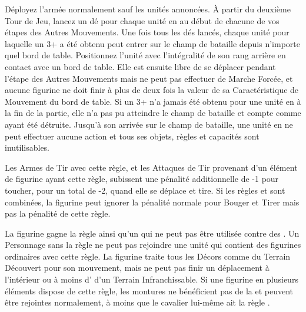  Déployez l'armée normalement sauf les unités annoncées. À partir du deuxième Tour de Jeu, lancez un dé pour chaque unité en \ambush{} au début de chacune de vos étapes des Autres Mouvements. Une fois tous les dés lancés, chaque unité pour laquelle un 3+ a été obtenu peut entrer sur le champ de bataille depuis n'importe quel bord de table. Positionnez l'unité avec l'intégralité de son rang arrière en contact avec un bord de table. Elle est ensuite libre de se déplacer pendant l'étape des Autres Mouvements mais ne peut pas effectuer de Marche Forcée, et aucune figurine ne doit finir à plus de deux fois la valeur de sa Caractéristique de Mouvement du bord de table. Si un 3+ n'a jamais été obtenu pour une unité en \ambush{} à la fin de la partie, elle n'a pas pu atteindre le champ de bataille et compte comme ayant été détruite.  Jusqu'à son arrivée sur le champ de bataille, une unité en \ambush{} ne peut effectuer aucune action et tous ses objets, règles et capacités sont inutilisables.


Les Armes de Tir avec cette règle, et les Attaques de Tir provenant d'un élément de figurine ayant cette règle, subissent une pénalité additionnelle de -1 pour toucher, pour un total de -2, quand elle se déplace et tire. Si les règles \unwieldy{} et \quicktofire{} sont combinées, la figurine peut ignorer la pénalité normale pour Bouger et Tirer mais pas la pénalité de cette règle.


La figurine gagne la règle \magicalattacks{} ainsi qu'un  qui ne peut pas être utilisée contre des \magicalattacks{}. Un Personnage sans la règle \ethereal{} ne peut pas rejoindre une unité qui contient des figurines ordinaires avec cette règle. La figurine traite tous les Décors comme du Terrain Découvert pour son mouvement, mais ne peut pas finir un déplacement à l'intérieur ou à moins d' d'un Terrain Infranchissable. Si une figurine en plusieurs éléments dispose de cette règle, les montures ne bénéficient pas de la \wardsave{} et peuvent être rejointes normalement, à moins que le cavalier lui-même ait la règle \ethereal{}.

